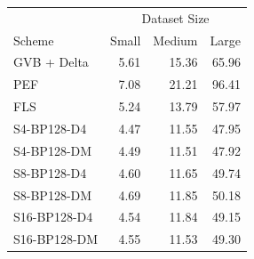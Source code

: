\begin{tabular}{lrrr}
\toprule
 & \multicolumn{3}{c}{Dataset Size} \\
Scheme & Small & Medium & Large \\
\midrule
GVB + Delta & 5.61 & 15.36 & 65.96 \\
PEF & 7.08 & 21.21 & 96.41 \\
FLS & 5.24 & 13.79 & 57.97 \\
S4-BP128-D4 & 4.47 & 11.55 & 47.95 \\
S4-BP128-DM & 4.49 & 11.51 & 47.92 \\
S8-BP128-D4 & 4.60 & 11.65 & 49.74 \\
S8-BP128-DM & 4.69 & 11.85 & 50.18 \\
S16-BP128-D4 & 4.54 & 11.84 & 49.15 \\
S16-BP128-DM & 4.55 & 11.53 & 49.30 \\
\bottomrule
\end{tabular}

